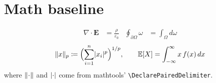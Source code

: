 \documentclass{article}
\DeclarePairedDelimiter{\norm}{\lVert}{\rVert}
\DeclarePairedDelimiter{\abs}{\lvert}{\rvert}
\begin{document}
\section{Math baseline}
\begin{align}
  \nabla \cdot \mathbf{E} &= \frac{\rho}{\varepsilon_0} &
  \oint_{\partial\Omega} \omega &= \int_\Omega d\omega
\end{align}
\[
  \norm{x}_p \coloneqq \Bigl(\sum_{i=1}^n \abs{x_i}^p\Bigr)^{1/p},
  \qquad
  \mathbb{E}[X] = \int_{-\infty}^{\infty} x\,f(x)\,dx
\]
where \(\norm{\cdot}\) and \(\abs{\cdot}\) come from mathtools' \verb|\DeclarePairedDelimiter|.
\end{document}
